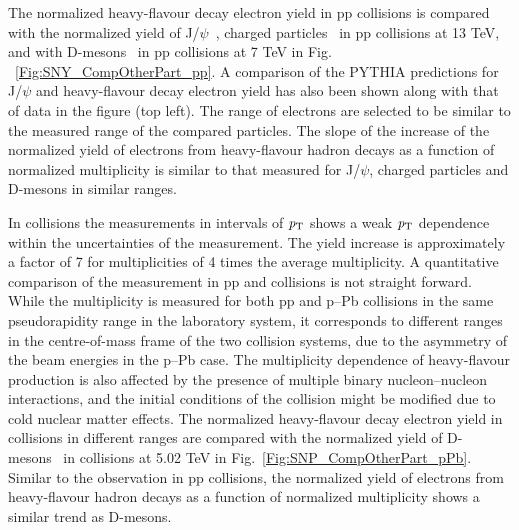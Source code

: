 The normalized heavy-flavour decay electron yield in pp collisions is compared with the normalized yield of J/$\psi$~\cite{Acharya:2020pit}, charged particles~\cite{Acharya:2019mzb} in pp collisions at 13 TeV, and with D-mesons~\cite{Adam:2015ota} in pp collisions at 7 TeV in Fig. ~\ref{Fig:SNY_CompOtherPart_pp}. A comparison of the PYTHIA predictions for J/$\psi$ and heavy-flavour decay electron yield has also been shown along with that of data in the figure (top left). The \pt range of electrons are selected to be similar to the measured \pt range of the compared particles. The slope of the increase of the normalized yield of electrons from heavy-flavour hadron decays as a function of normalized multiplicity is similar to that measured for J/$\psi$, charged particles and D-mesons in similar \pt ranges.

In \pPb collisions the measurements in intervals of ${\it p}_{\rm T}$ shows a weak ${\it p}_{\rm T}$ dependence within the uncertainties of the measurement. The yield increase is approximately a factor of 7 for multiplicities of 4 times the average multiplicity. A quantitative comparison of the measurement in pp and \pPb collisions is not straight forward.  While the multiplicity
is measured for both pp and p–Pb collisions in the same pseudorapidity range in the laboratory system, it corresponds to different ranges in the centre-of-mass frame of the two collision systems, due to
the asymmetry of the beam energies in the p–Pb case. The multiplicity dependence of heavy-flavour production is also affected by the presence of multiple binary nucleon–nucleon interactions, and the initial conditions of the collision might be modified due to cold nuclear matter effects. 
The normalized heavy-flavour decay electron yield in \pPb collisions in different \pt ranges are compared with the normalized yield of D-mesons~\cite{Adam:2016mkz} in \pPb collisions at 5.02 TeV in Fig.~\ref{Fig:SNP_CompOtherPart_pPb}. Similar to the observation in pp collisions, the normalized yield of electrons from heavy-flavour hadron decays as a function of normalized multiplicity shows a similar trend as D-mesons.


